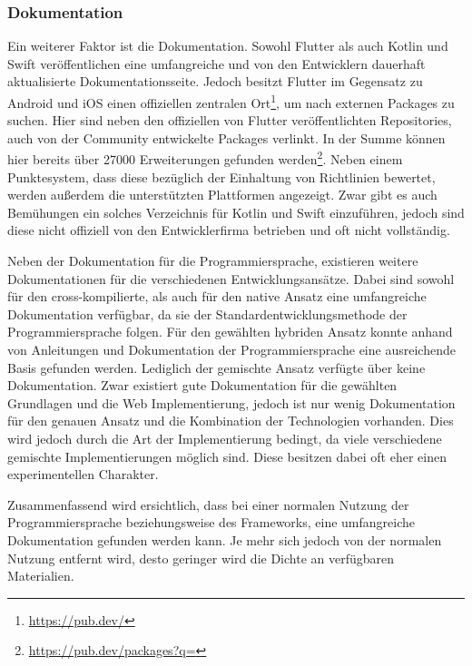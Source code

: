 \subsubsection{Dokumentation}
Ein weiterer Faktor ist die Dokumentation. Sowohl Flutter als auch Kotlin und Swift veröffentlichen eine umfangreiche und von den Entwicklern dauerhaft aktualisierte Dokumentationsseite. Jedoch besitzt Flutter im Gegensatz zu Android und iOS einen offiziellen zentralen Ort\footnote{\url{https://pub.dev/}}, um nach externen Packages zu suchen. Hier sind neben den offiziellen von Flutter veröffentlichten Repositories, auch von der Community entwickelte Packages verlinkt. In der Summe können hier bereits über 27000 Erweiterungen gefunden werden\footnote{\url{https://pub.dev/packages?q=}}. Neben einem Punktesystem, dass diese bezüglich der Einhaltung von Richtlinien bewertet, werden außerdem die unterstützten Plattformen angezeigt. Zwar gibt es auch Bemühungen ein solches Verzeichnis für Kotlin und Swift einzuführen, jedoch sind diese nicht offiziell von den Entwicklerfirma betrieben und oft nicht vollständig.

Neben der Dokumentation für die Programmiersprache, existieren weitere Dokumentationen für die verschiedenen Entwicklungsansätze. Dabei sind sowohl für den cross-kompilierte, als auch für den native Ansatz eine umfangreiche Dokumentation verfügbar, da sie der Standardentwicklungsmethode der Programmiersprache folgen. Für den gewählten hybriden Ansatz konnte anhand von Anleitungen und Dokumentation der Programmiersprache eine ausreichende Basis gefunden werden. Lediglich der gemischte Ansatz verfügte über keine Dokumentation. Zwar existiert gute Dokumentation für die gewählten Grundlagen und die Web Implementierung, jedoch ist nur wenig Dokumentation für den genauen Ansatz und die Kombination der Technologien vorhanden. Dies wird jedoch durch die Art der Implementierung bedingt, da viele verschiedene gemischte Implementierungen möglich sind. Diese besitzen dabei oft eher einen experimentellen Charakter.

Zusammenfassend wird ersichtlich, dass bei einer normalen Nutzung der Programmiersprache beziehungsweise des Frameworks, eine umfangreiche Dokumentation gefunden werden kann. Je mehr sich jedoch von der normalen Nutzung entfernt wird, desto geringer wird die Dichte an verfügbaren Materialien. 

